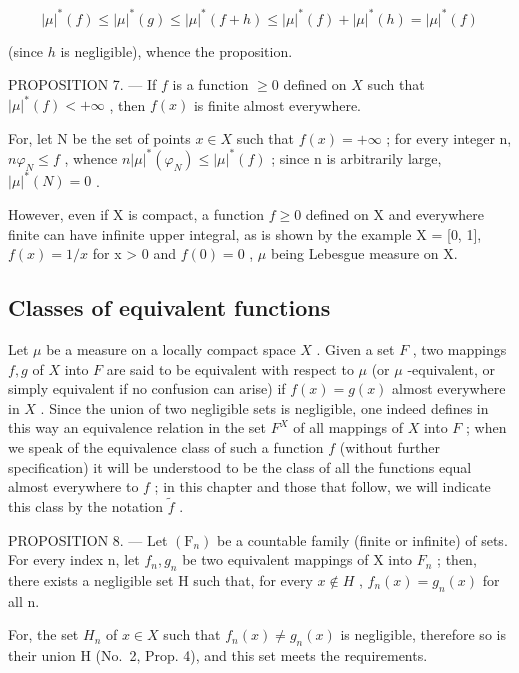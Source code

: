 \[
| \mu | ^ {*} (f) \leqslant | \mu | ^ {*} (g) \leqslant | \mu | ^ {*} (f + h) \leqslant | \mu | ^ {*} (f) + | \mu | ^ {*} (h) = | \mu | ^ {*} (f)
\]

(since \(h\) is negligible), whence the proposition.

PROPOSITION 7. --- If \(f\) is a function \(\geqslant 0\) defined on \(X\) such that \(|\mu|^*(f) < +\infty\) , then \(f(x)\) is finite almost everywhere.

For, let N be the set of points \(x \in X\) such that \(f(x) = +\infty\) ; for every integer n, \(n\varphi_{N} \leqslant f\) , whence \(n|\mu|^{*}(\varphi_{N}) \leqslant |\mu|^{*}(f)\) ; since n is arbitrarily large, \(|\mu|^{*}(N) = 0\) .

However, even if X is compact, a function \(f \geqslant 0\) defined on X and everywhere finite can have infinite upper integral, as is shown by the example X = {[}0, 1{]}, \(f(x) = 1/x\) for x \textgreater{} 0 and \(f(0) = 0\) , \(\mu\) being Lebesgue measure on X.

\subsection{Classes of equivalent functions}

Let \(\mu\) be a measure on a locally compact space \(X\) . Given a set \(F\) , two mappings \(f, g\) of \(X\) into \(F\) are said to be equivalent with respect to \(\mu\) (or \(\mu\) -equivalent, or simply equivalent if no confusion can arise) if \(f(x) = g(x)\) almost everywhere in \(X\) . Since the union of two negligible sets is negligible, one indeed defines in this way an equivalence relation in the set \(F^X\) of all mappings of \(X\) into \(F\) ; when we speak of the equivalence class of such a function \(f\) (without further specification) it will be understood to be the class of all the functions equal almost everywhere to \(f\) ; in this chapter and those that follow, we will indicate this class by the notation \(\widetilde{f}\) .

PROPOSITION 8. --- Let \((\mathrm{F}_{n})\) be a countable family (finite or infinite) of sets. For every index n, let \(f_{n}, g_{n}\) be two equivalent mappings of X into \(F_{n}\) ; then, there exists a negligible set H such that, for every \(x \notin H\) , \(f_{n}(x) = g_{n}(x)\) for all n.

For, the set \(H_{n}\) of \(x \in X\) such that \(f_{n}(x) \neq g_{n}(x)\) is negligible, therefore so is their union H (No.~2, Prop. 4), and this set meets the requirements.

